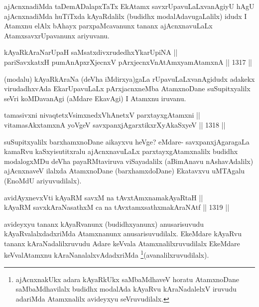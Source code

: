 \begin{artha}
ajAcnxnadiMda taDemADalapxTaTx EkAtamx savxrUpavuLaLxvanAgiyU hAgU ajAcnxnadiMda huTiTxda kAyaRdalilx (budidhx modalAdavugaLalilx) idudx I Atamxnu elAlx bAhayx parxpaMcavanunx tananx ajAcnxnavuLaLx AtamxsavxrUpavanunx ariyuvanu.
\end{artha}

\begin{shl}
kAyaRkAraNarUpaH saMsatxdivxrudedhxYkarUpiNA || \\
pariSavxkatxH pumAnApxrXjecnxV pArxjecnxVnA\s \s tAmx\s yamAtamxnA \hfill || 1317 ||  
\end{shl}

\begin{artha}
(modalu) kAyaRkAraNa (deVha iMdirxya)gaLa rUpavuLaLxvanAgidudx adakekx virudadhxvAda EkarUpavuLaLx pArxjacnxneMba AtamxnoDane suSupitxyalilx seVri koMDavanAgi (aMdare EkavAgi) I Atamxnu iruvanu.
\end{artha}

\begin{shl}
tamasivxni nivaqtetxV\s simxnedxVhAnetxV parxtayxgAtamxni || \\
vitamasAkxtamxnA yoVgeV savxpanxjAgarxtikxrXyAkaSxyeV \hfill || 1318 ||  
\end{shl}

\begin{artha}
suSupitxyalilx barxhamxnoDane aikayxvu heVge? eMdare- savxpanxjAgaragaLa kamaRvu kaSxyisutitxralu ajAcnxnavuLaLx parxtayxgAtamxnalilx budidhx modalogxMDu deVha payaRMtaviruva viSayadalilx (aBimAnavu nAshavAdalilx) ajAcnxnaveV ilalxda AtamxnoDane (barxhamxdoDane) Ekatavxvu uMTAgalu (EnoMdU ariyuvudilalx).
\end{artha}


\begin{shl}
avidAyx\s nevxVti kAyaRM savxM na tAvxtAmxnamakAyaRtaH || \\
kAyaRM savxkAraNasathxM ca na tAvxtamxsathxmakAraNAtf \hfill || 1319 || 
\end{shl}

\begin{artha}
avideyxyu tananx kAyaRvanunx (budidhxyanunx) anusarisuvudu kAyaRvalalxdadxriMda Atamxnanunx anusarisuvudilalx. EkeMdare kAyaRvu tananx kAraNadalilxruvudu Adare keVvala Atamxnalilxruvudilalx EkeMdare keVvalAtamxnu kAraNanalalxvAdadxriMda \footnote{ajAcnxnakUkx adara kAyaRkUkx saMbaMdhaveV horatu AtamxnoDane saMbaMdhavilalx budidhx modalAda kAyaRvu kAraNadalelxV iruvudu adariMda Atamxnalilx avideyxyu seVruvudilalx.}(avanalilxruvudilalx).
\end{artha}

